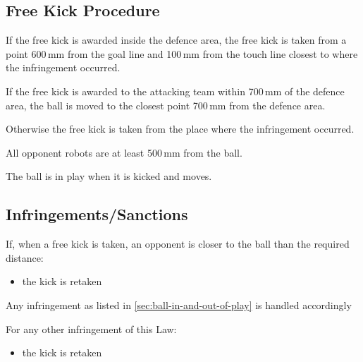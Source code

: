 \subsection{Free Kick Procedure}
If the free kick is awarded inside the defence area, the free kick is taken from a point 600\,mm from the goal line and 100\,mm from the touch line closest to where the infringement occurred.

If the free kick is awarded to the attacking team within 700\,mm of the defence area, the ball is moved to the closest point 700\,mm from the defence area.

Otherwise\added{,} the free kick is taken from the place where the infringement occurred.

All opponent robots are at least 500\,mm from the ball.

The ball is in play when it is kicked and moves.

\subsection{Infringements/Sanctions}
If, when a free kick is taken, an opponent is closer to the ball than the required distance:
\begin{itemize}
\item the kick is retaken
\end{itemize}

Any infringement as listed in \autoref{sec:ball-in-and-out-of-play} is handled accordingly

For any other infringement of this Law:
\begin{itemize}
\item the kick is retaken
\end{itemize}
